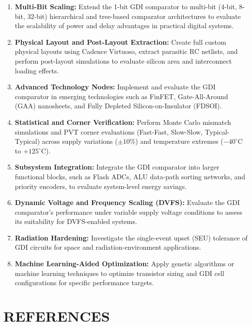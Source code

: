 \documentclass[12pt,a4paper,oneside]{report}
\begin{document}
\begin{enumerate}
\item \textbf{Multi-Bit Scaling:} Extend the 1-bit GDI comparator to multi-bit (4-bit, 8-bit, 32-bit) hierarchical and tree-based comparator architectures to evaluate the scalability of power and delay advantages in practical digital systems.
\item \textbf{Physical Layout and Post-Layout Extraction:} Create full custom physical layouts using Cadence Virtuoso, extract parasitic RC netlists, and perform post-layout simulations to evaluate silicon area and interconnect loading effects.
\item \textbf{Advanced Technology Nodes:} Implement and evaluate the GDI comparator in emerging technologies such as FinFET, Gate-All-Around (GAA) nanosheets, and Fully Depleted Silicon-on-Insulator (FDSOI).
\item \textbf{Statistical and Corner Verification:} Perform Monte Carlo mismatch simulations and PVT corner evaluations (Fast-Fast, Slow-Slow, Typical-Typical) across supply variations ($\pm 10\%$) and temperature extremes ($-40^\circ\text{C}$ to $+125^\circ\text{C}$).
\item \textbf{Subsystem Integration:} Integrate the GDI comparator into larger functional blocks, such as Flash ADCs, ALU data-path sorting networks, and priority encoders, to evaluate system-level energy savings.
\item \textbf{Dynamic Voltage and Frequency Scaling (DVFS):} Evaluate the GDI comparator's performance under variable supply voltage conditions to assess its suitability for DVFS-enabled systems.
\item \textbf{Radiation Hardening:} Investigate the single-event upset (SEU) tolerance of GDI circuits for space and radiation-environment applications.
\item \textbf{Machine Learning-Aided Optimization:} Apply genetic algorithms or machine learning techniques to optimize transistor sizing and GDI cell configurations for specific performance targets.
\end{enumerate}


\clearpage
\chapter*{REFERENCES}
\end{document}
